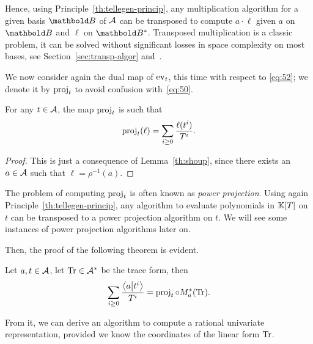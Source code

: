 Hence, using Principle~\ref{th:tellegen-princip}, any multiplication
algorithm for a given basis $\basis{B}$ of $\mathcal{A}$ can be
transposed to compute $a\cdot\ell$ given $a$ on $\basis{B}$ and $\ell$
on $\dual{\basis{B}}$. Transposed multiplication is a classic problem,
it can be solved without significant losses in space complexity on
most bases, see Section~\ref{sec:transp-algor}
and~\cite{shoup95,shoup99,bostan+lecerf+schost:tellegen,hanrot+quercia+zimmermann,pascal+schost06}.

We now consider again the dual map of $\operatorname{ev}_t$, this time with respect
to \eqref{eq:52}; we denote it by $\operatorname{proj}_t$ to avoid confusion
with~\eqref{eq:50}.

\begin{lemma}
  \label{th:shoup94}
  For any $t\in\mathcal{A}$, the map $\operatorname{proj}_t$ is such that
  \begin{equation}
    \label{eq:55}
    \operatorname{proj}_t(\ell) = \sum_{i\ge0}\frac{\ell(t^i)}{T^{i}}
    \text{.}
  \end{equation}  
\end{lemma}
\begin{proof}
  This is just a consequence of Lemma~\ref{th:shoup}, since there
  exists an $a\in\mathcal{A}$ such that $\ell=\rho^{-1}(a)$.
\end{proof}

The problem of computing $\operatorname{proj}_t$ is often known as \emph{power
  projection}. Using again Principle~\ref{th:tellegen-princip}, any
algorithm to evaluate polynomials in $\mathbb{K}[T]$ on $t$ can be transposed
to a power projection algorithm on $t$. We will see some instances of
power projection algorithms later on.

Then, the proof of the following theorem is evident.

\begin{theorem}
  \label{th:power-projection}
  Let $a,t\in\mathcal{A}$, let $\operatorname{Tr}\in\mathcal{A}^\ast$ be the trace
  form, then
  \begin{equation}
    \label{eq:56}
    \sum_{i\ge0}\frac{\left\langle a \middle| t^i \right\rangle}{T^i} = \operatorname{proj}_t\circ M_a^\ast(\operatorname{Tr})
    \text{.}
  \end{equation}
\end{theorem}

From it, we can derive an algorithm to compute a rational univariate
representation, provided we know the coordinates of the linear form
$\operatorname{Tr}$.

